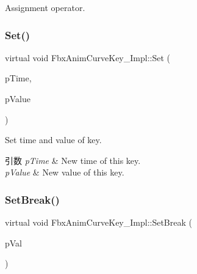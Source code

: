 Assignment operator. \mbox{\label{class_fbx_anim_curve_key___impl_a07c1455e7457020e5452670ecedc6388}} 
\subsubsection{\texorpdfstring{Set()}{Set()}}
{\footnotesize\ttfamily virtual void Fbx\+Anim\+Curve\+Key\+\_\+\+Impl\+::\+Set (\begin{DoxyParamCaption}\item[{\hyperlink{class_fbx_time}{Fbx\+Time}}]{p\+Time,  }\item[{float}]{p\+Value }\end{DoxyParamCaption})\hspace{0.3cm}{\ttfamily [pure virtual]}}

Set time and value of key. 
\begin{DoxyParams}{引数}
{\em p\+Time} & New time of this key. \\
\hline
{\em p\+Value} & New value of this key. \\
\hline
\end{DoxyParams}
\mbox{\label{class_fbx_anim_curve_key___impl_ae03e1fe4dd15e95d9ebfc1ef3d61373e}} 
\subsubsection{\texorpdfstring{Set\+Break()}{SetBreak()}}
{\footnotesize\ttfamily virtual void Fbx\+Anim\+Curve\+Key\+\_\+\+Impl\+::\+Set\+Break (\begin{DoxyParamCaption}\item[{bool}]{p\+Val }\end{DoxyParamCaption})\hspace{0.3cm}{\ttfamily [pure virtual]}}

